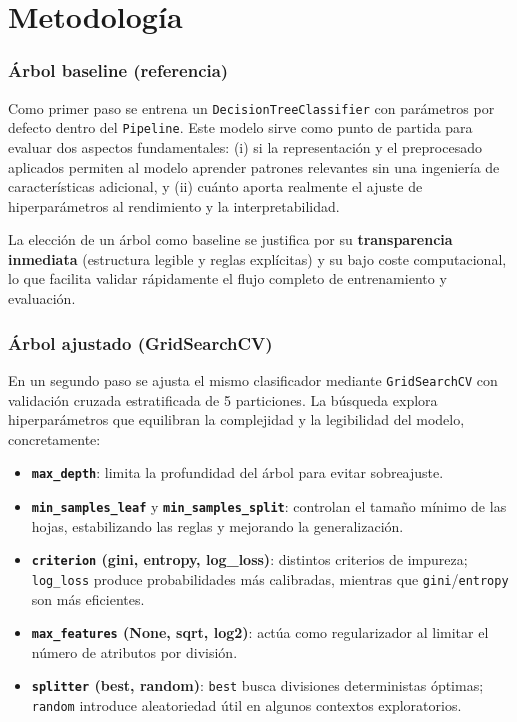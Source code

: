 \section{Metodología}

\subsubsection{Árbol baseline (referencia)}
Como primer paso se entrena un \texttt{DecisionTreeClassifier} con parámetros por defecto dentro del \texttt{Pipeline}. Este modelo sirve como punto de partida para evaluar dos aspectos fundamentales: (i) si la representación y el preprocesado aplicados permiten al modelo aprender patrones relevantes sin una ingeniería de características adicional, y (ii) cuánto aporta realmente el ajuste de hiperparámetros al rendimiento y la interpretabilidad. 

La elección de un árbol como baseline se justifica por su \textbf{transparencia inmediata} (estructura legible y reglas explícitas) y su bajo coste computacional, lo que facilita validar rápidamente el flujo completo de entrenamiento y evaluación.

\subsubsection{Árbol ajustado (GridSearchCV)}
En un segundo paso se ajusta el mismo clasificador mediante \texttt{GridSearchCV} con validación cruzada estratificada de 5 particiones. La búsqueda explora hiperparámetros que equilibran la complejidad y la legibilidad del modelo, concretamente:

\begin{itemize}
  \item \textbf{\texttt{max\_depth}}: limita la profundidad del árbol para evitar sobreajuste.
  \item \textbf{\texttt{min\_samples\_leaf}} y \textbf{\texttt{min\_samples\_split}}: controlan el tamaño mínimo de las hojas, estabilizando las reglas y mejorando la generalización.
  \item \textbf{\texttt{criterion} (gini, entropy, log\_loss)}: distintos criterios de impureza; \texttt{log\_loss} produce probabilidades más calibradas, mientras que \texttt{gini}/\texttt{entropy} son más eficientes.
  \item \textbf{\texttt{max\_features} (None, sqrt, log2)}: actúa como regularizador al limitar el número de atributos por división.
  \item \textbf{\texttt{splitter} (best, random)}: \texttt{best} busca divisiones deterministas óptimas; \texttt{random} introduce aleatoriedad útil en algunos contextos exploratorios.
\end{itemize}

